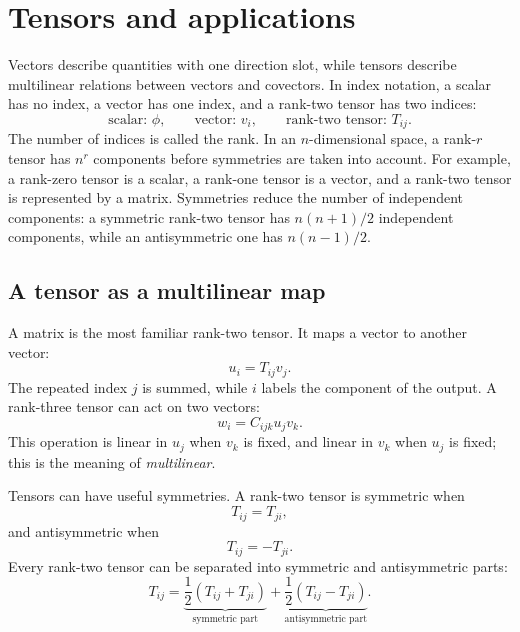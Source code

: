 \section{Tensors and applications}

Vectors describe quantities with one direction slot, while tensors describe multilinear relations between vectors and covectors. In index notation, a scalar has no index, a vector has one index, and a rank-two tensor has two indices:
\begin{equation}
\text{scalar: }\phi,
\qquad
\text{vector: }v_i,
\qquad
\text{rank-two tensor: }T_{ij}.
\end{equation}
The number of indices is called the rank. In an $n$-dimensional space, a rank-$r$ tensor has $n^r$ components before symmetries are taken into account.
For example, a rank-zero tensor is a scalar, a rank-one tensor is a vector, and a rank-two tensor is represented by a matrix. Symmetries reduce the number of independent components: a symmetric rank-two tensor has $n(n+1)/2$ independent components, while an antisymmetric one has $n(n-1)/2$.

\subsection{A tensor as a multilinear map}
A matrix is the most familiar rank-two tensor. It maps a vector to another vector:
\begin{equation}
u_i=T_{ij}v_j.
\end{equation}
The repeated index $j$ is summed, while $i$ labels the component of the output. A rank-three tensor can act on two vectors:
\begin{equation}
w_i=C_{ijk}u_jv_k.
\end{equation}
This operation is linear in $u_j$ when $v_k$ is fixed, and linear in $v_k$ when $u_j$ is fixed; this is the meaning of \emph{multilinear}.

Tensors can have useful symmetries. A rank-two tensor is symmetric when
\begin{equation}
T_{ij}=T_{ji},
\end{equation}
and antisymmetric when
\begin{equation}
T_{ij}=-T_{ji}.
\end{equation}
Every rank-two tensor can be separated into symmetric and antisymmetric parts:
\begin{equation}
T_{ij}=\underbrace{\frac12(T_{ij}+T_{ji})}_{\text{symmetric part}}
+\underbrace{\frac12(T_{ij}-T_{ji})}_{\text{antisymmetric part}}.
\end{equation}

